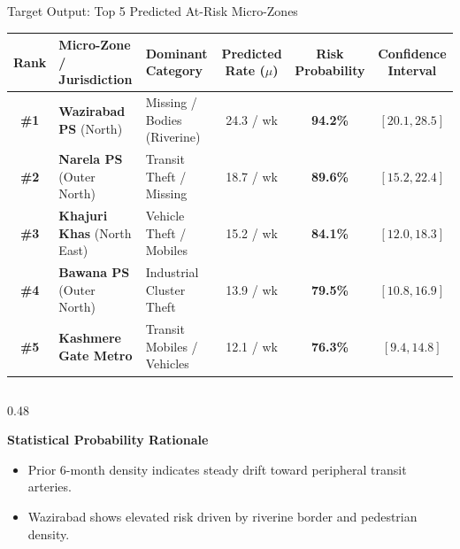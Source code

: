\documentclass[aspectratio=169,10pt]{beamer}
\begin{document}
\begin{frame}{Target Output: Top 5 Predicted At-Risk Micro-Zones}
  \begin{table}
    \centering
    \small
    \begin{tabular}{cllccc}
      \toprule
      \textbf{Rank} & \textbf{Micro-Zone / Jurisdiction} & \textbf{Dominant Category} & \textbf{Predicted Rate ($\mu$)} & \textbf{Risk Probability} & \textbf{Confidence Interval} \\
      \midrule
      \rowcolor{CrimsonAlert!15} \textbf{\#1} & \textbf{Wazirabad PS} (North) & Missing / Bodies (Riverine) & 24.3 / wk & \textbf{94.2\%} & $[20.1, 28.5]$ \\
      \rowcolor{CrimsonAlert!10} \textbf{\#2} & \textbf{Narela PS} (Outer North) & Transit Theft / Missing & 18.7 / wk & \textbf{89.6\%} & $[15.2, 22.4]$ \\
      \rowcolor{AlertAmber!15} \textbf{\#3} & \textbf{Khajuri Khas} (North East) & Vehicle Theft / Mobiles & 15.2 / wk & \textbf{84.1\%} & $[12.0, 18.3]$ \\
      \rowcolor{AlertAmber!10} \textbf{\#4} & \textbf{Bawana PS} (Outer North) & Industrial Cluster Theft & 13.9 / wk & \textbf{79.5\%} & $[10.8, 16.9]$ \\
      \rowcolor{CardBg} \textbf{\#5} & \textbf{Kashmere Gate Metro} & Transit Mobiles / Vehicles & 12.1 / wk & \textbf{76.3\%} & $[9.4, 14.8]$ \\
      \bottomrule
    \end{tabular}
  \end{table}

  \begin{columns}[T]
    \begin{column}{0.48\textwidth}
      \begin{block}{\textbf{Statistical Probability Rationale}}
        \footnotesize
        \begin{itemize}\itemsep=0.2em
          \item Prior 6-month density indicates steady drift toward peripheral transit arteries.
          \item Wazirabad shows elevated risk driven by riverine border and pedestrian density.
        \end{itemize}
      \end{block}
    \end{column}


\end{columns}
\end{frame}
\end{document}

